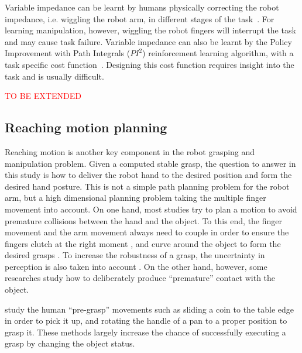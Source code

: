 Variable impedance can be learnt by humans physically correcting the robot impedance, i.e. wiggling the robot arm, in different stages of the task~\citep{kronander2012online}. For learning manipulation, however, wiggling the robot fingers will interrupt the task and may cause task failure.
Variable impedance can also be learnt by the Policy Improvement with Path Integrals ($PI^2$) reinforcement learning algorithm, with a task specific cost function~\citep{buchli2011learning}. Designing this cost function requires insight into the task and is usually difficult.

\textcolor{red}{TO BE EXTENDED}

\subsection{Reaching motion planning}
\label{cha2:sec1:reaching}

Reaching motion is another key component in the robot grasping and manipulation problem. Given a computed stable grasp, the question to answer in this study is how to deliver the robot hand to the desired position and form the desired hand posture. This is not a simple path planning problem for the robot arm, but a high dimensional planning problem taking the multiple finger movement into account. On one hand, most studies try to plan a motion to avoid premature collisions between the hand and the object. To this end, the finger movement and the arm movement always need to couple in order to ensure the fingers clutch at the right moment \citep{Shukla2011CDS}, and curve around the object to form the desired grasps \citep{kroemer2011grasping}. To increase the robustness of a grasp, the uncertainty in perception is also taken into account \citep{stulp2011learning}. On the other hand, however, some researches study how to deliberately produce ``premature'' contact with the object.

\citet{chang2010planning} study the human ``pre-grasp'' movements such as sliding a coin to the table edge in order to pick it up, and rotating the handle of a pan to a proper position to grasp it. These methods largely increase the chance of successfully executing a grasp by changing the object status.
